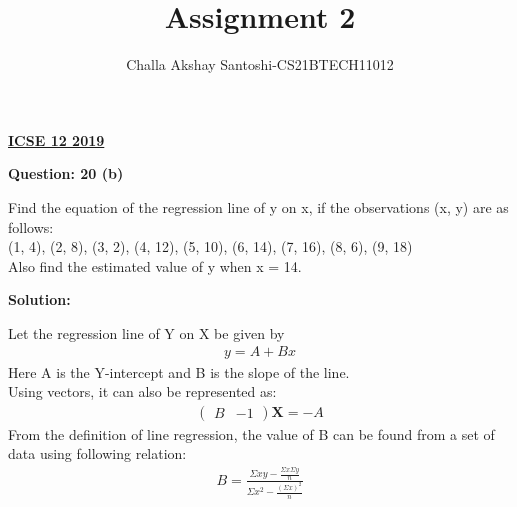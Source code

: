 \documentclass[journal,12pt,twocolumn]{IEEEtran}
\begin{document}
\newcommand{\myvec}[1]{\ensuremath{\begin{pmatrix}#1\end{pmatrix}}}
\newcommand{\mydet}[1]{\ensuremath{\begin{vmatrix}#1\end{vmatrix}}}
\makeatletter
{}
\makeatother
\let\StandardTheFigure\thefigure
\let\vec\mathbf
\renewcommand{\thefigure}{\theproblem}
\def\putbox#1#2#3{\makebox[0in][l]{\makebox[#1][l]{}\raisebox{\baselineskip}[0in][0in]{\raisebox{#2}[0in][0in]{#3}}}}
     \def\rightbox#1{\makebox[0in][r]{#1}}
     \def\centbox#1{\makebox[0in]{#1}}
     \def\topbox#1{\raisebox{-\baselineskip}[0in][0in]{#1}}
     \def\midbox#1{\raisebox{-0.5\baselineskip}[0in][0in]{#1}}
\vspace{3cm}
\title{Assignment 2}
\author{Challa Akshay Santoshi-CS21BTECH11012}
\maketitle
\newpage
\bigskip
\renewcommand{\thefigure}{\theenumi}
\renewcommand{\thetable}{\theenumi}
\begin{center}
  \textbf{\underline{ICSE 12 2019}}\\
\end{center}
\begin{center}
  \textbf{Question: 20 (b)}  
\end{center}
Find the equation of the regression line of y on x, if the observations (x, y) are as follows:\\
(1, 4), (2, 8), (3, 2), (4, 12), (5, 10), (6, 14), (7, 16), (8, 6), (9, 18)\\
Also find the estimated value of y when x = 14.\\
\begin{center}
  \textbf{Solution:}  
\end{center}
Let the regression line of Y on X be given by
\begin{align}
    y = A + Bx
\end{align}
Here A is the Y-intercept and B is the slope of the line.\\
Using vectors, it can also be represented as:
\begin{align}
    \myvec{B & -1}\vec{X} = -A
\end{align}
From the definition of line regression, the value of B can be found from a set of data using following relation:\\
\begin{align}
    B = \frac{\Sigma xy - \frac{\Sigma x \Sigma y}{n}}{\Sigma x^2 - \frac{(\Sigma x)^2}{n}}
\end{align}
\end{document}
